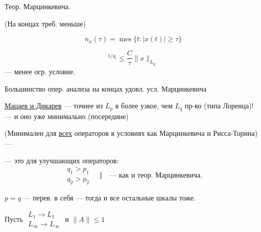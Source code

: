 Теор. Марцинкевича.

(На концах треб. меньше)



\begin{equation*}
 n_x(\tau)=\operatorname{mes}\{t:|x(t)|\geq\tau\}
\end{equation*}



\begin{equation*}
 [n_{Ax}(\tau)]^{1/q_i}\leq\frac{C}{\tau}\|x\|_{L_{p_i}}
\end{equation*}
— менее огр. условие.



Большинство опер. анализа на концах удовл. усл. Марцинкевича



\underline{Мацаев и Дикарев} — точнее из $L_p$ в более узкое, чем $L_q$
пр-во (типа Лоренца)! — и оно уже минимально (посередине)



(Минимален для \underline{всех} операторов
в условиях как Марцинкевича и Рисса-Торина) —



— это для улучшающих операторов:
\begin{equation*}
\begin{gathered}q_1>p_1\\q_2>p_2\end{gathered}
\quad\Big\Vert\quad\text{— как и теор. Марцинкевича.}
\end{equation*}



$p=q$ — перев. в себя — тогда и все остальные шкалы тоже.



Пусть
$\begin{gathered}L_1\longrightarrow L_1\\L_\infty\longrightarrow L_\infty\end{gathered}$
\quad и $\|A\|\leq1$



